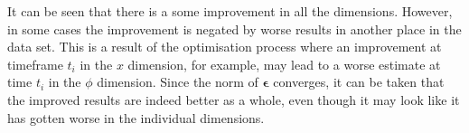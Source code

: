 
It can be seen that there is a some improvement in all the dimensions. However, in some cases the improvement is negated by worse results in another place in the data set. This is a result of the optimisation process where an improvement at timeframe $t_i$ in the $x$ dimension, for example, may lead to a worse estimate at time $t_i$ in the $\phi$ dimension. Since the norm of $\bm{\epsilon}$ converges, it can be taken that the improved results are indeed better as a whole, even though it may look like it has gotten worse in the individual dimensions.

